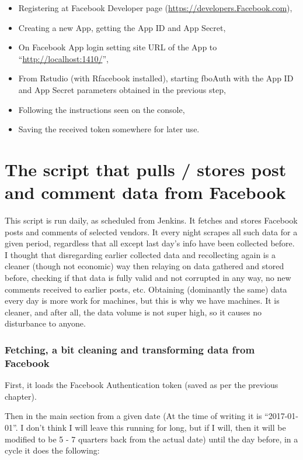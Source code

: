 \documentclass[]{article}
\providecommand{\tightlist}{%
  \setlength{\itemsep}{0pt}\setlength{\parskip}{0pt}}
\begin{document}
\begin{itemize}
\tightlist
\item
  Registering at Facebook Developer page
  (\url{https://developers.Facebook.com}),
\item
  Creating a new App, getting the App ID and App Secret,
\item
  On Facebook App login setting site URL of the App to
  ``\url{http://localhost:1410/}'',
\item
  From Rstudio (with Rfacebook installed), starting fboAuth with the App
  ID and App Secret parameters obtained in the previous step,
\item
  Following the instructions seen on the console,
\item
  Saving the received token somewhere for later use.
\end{itemize}

\section{The script that pulls / stores post and comment data from
Facebook}\label{the-script-that-pulls-stores-post-and-comment-data-from-facebook}

This script is run daily, as scheduled from Jenkins. It fetches and
stores Facebook posts and comments of selected vendors. It every night
scrapes all such data for a given period, regardless that all except
last day's info have been collected before. I thought that disregarding
earlier collected data and recollecting again is a cleaner (though not
economic) way then relaying on data gathered and stored before, checking
if that data is fully valid and not corrupted in any way, no new
comments received to earlier posts, etc. Obtaining (dominantly the same)
data every day is more work for machines, but this is why we have
machines. It is cleaner, and after all, the data volume is not super
high, so it causes no disturbance to anyone.

\subsubsection{Fetching, a bit cleaning and transforming data from
Facebook}\label{fetching-a-bit-cleaning-and-transforming-data-from-facebook}

First, it loads the Facebook Authentication token (saved as per the
previous chapter).

Then in the main section from a given date (At the time of writing it is
``2017-01-01''. I don't think I will leave this running for long, but if
I will, then it will be modified to be 5 - 7 quarters back from the
actual date) until the day before, in a cycle it does the following:
\end{document}
